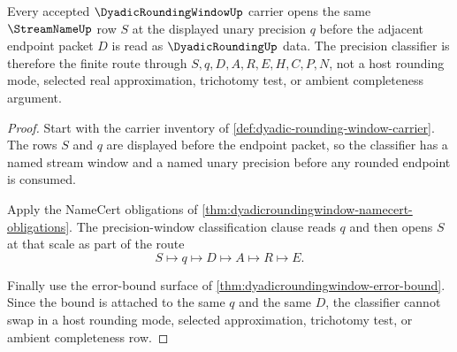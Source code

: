 \begin{theorem}
\label{thm:dyadicroundingwindow-precision-classification}
Every accepted $\DyadicRoundingWindowUp$ carrier opens the same $\StreamNameUp$ row $S$ at the displayed unary precision $q$ before the adjacent endpoint packet $D$ is read as $\DyadicRoundingUp$ data. The precision classifier is therefore the finite route through $S,q,D,A,R,E,H,C,P,N$, not a host rounding mode, selected real approximation, trichotomy test, or ambient completeness argument.
\end{theorem}
\begin{proof}
Start with the carrier inventory of \autoref{def:dyadic-rounding-window-carrier}. The rows $S$ and $q$ are displayed before the endpoint packet, so the classifier has a named stream window and a named unary precision before any rounded endpoint is consumed.

Apply the NameCert obligations of \autoref{thm:dyadicroundingwindow-namecert-obligations}. The precision-window classification clause reads $q$ and then opens $S$ at that scale as part of the route
$$
S\longmapsto q\longmapsto D\longmapsto A\longmapsto R\longmapsto E .
$$

Finally use the error-bound surface of \autoref{thm:dyadicroundingwindow-error-bound}. Since the bound is attached to the same $q$ and the same $D$, the classifier cannot swap in a host rounding mode, selected approximation, trichotomy test, or ambient completeness row.
\end{proof}

